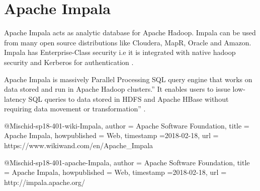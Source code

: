 \section{Apache Impala}

Apache Impala acts as analytic database for Apache Hadoop. Impala can be used
from many open source distributions like Cloudera, MapR, Oracle and Amazon.
Impala has Enterprise-Class security i.e it is integrated with native hadoop
security and Kerberos for authentication \cite{hid-sp18-401-wiki-Impala}.

Apache Impala is massively Parallel Processing SQL query engine that works on
data stored and run in Apache Hadoop clusters.” It enables users to issue low-
latency SQL queries to data stored in HDFS and Apache HBase without requiring
data movement or transformation” \cite{hid-sp18-401-apache-Impala}.


@Misc{hid-sp18-401-wiki-Impala,        
author = {Apache Software Foundation},
title = {Apache Impala},        
howpublished = {Web},        
timestamp ={2018-02-18},        
url = {https://www.wikiwand.com/en/Apache_Impala} }

@Misc{hid-sp18-401-apache-Impala,        
author = {Apache Software Foundation},
title  = {Apache Impala},        
howpublished = {Web},        
timestamp ={2018-02-18},        
url = {http://impala.apache.org/} }

